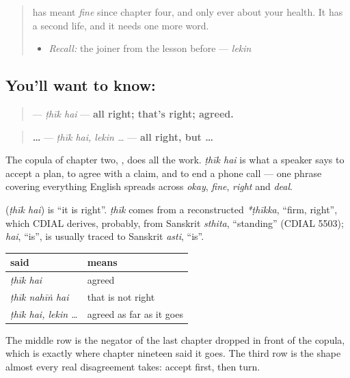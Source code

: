 \label{lesson:UR-C20-thik-hai}



\begin{quote}
\textbf{} has meant \emph{fine} since chapter four, and only ever about your health. It has a second life, and it needs one more word.

\begin{itemize}
\raggedright
  \item \emph{Recall:} the joiner from the lesson before — \emph{lekin}
\end{itemize}
\end{quote}

\subsection*{You'll want to know:  }
\begin{quote}
\textbf{ } — \emph{ṭhīk hai} — \textbf{all right; that's right; agreed.}
\end{quote}

\begin{quote}
\textbf{   …} — \emph{ṭhīk hai, lekin …} — \textbf{all right, but …}
\end{quote}

The copula of chapter two, \textbf{}, does all the work. \emph{ṭhīk hai} is what a speaker says to accept a plan, to agree with a claim, and to end a phone call — one phrase covering everything English spreads across \emph{okay}, \emph{fine}, \emph{right} and \emph{deal}.

\begin{cousinweb}
\textbf{ } (\emph{ṭhīk hai}) is \textquotedblleft{}it is right\textquotedblright{}. \emph{ṭhīk} comes from a reconstructed \emph{*ṭhīkka}, \textquotedblleft{}firm, right\textquotedblright{}, which CDIAL derives, probably, from Sanskrit \emph{sthita}, \textquotedblleft{}standing\textquotedblright{} (CDIAL 5503); \emph{hai}, \textquotedblleft{}is\textquotedblright{}, is usually traced to Sanskrit \emph{asti}, \textquotedblleft{}is\textquotedblright{}.
\end{cousinweb}

\begin{grammarlens}[title={Grammar Lens: agreeing, and taking it back}]
\noindent
\begin{tabularx}{\linewidth}{@{}>{\raggedright\arraybackslash}X>{\raggedright\arraybackslash}X@{}}
\toprule
\textbf{said} & \textbf{means} \\
\midrule
\emph{ṭhīk hai} & agreed \\
\emph{ṭhīk nahīṅ hai} & that is not right \\
\emph{ṭhīk hai, lekin …} & agreed as far as it goes \\
\bottomrule
\end{tabularx}

The middle row is the negator of the last chapter dropped in front of the copula, which is exactly where chapter nineteen said it goes. The third row is the shape almost every real disagreement takes: accept first, then turn.
\end{grammarlens}

